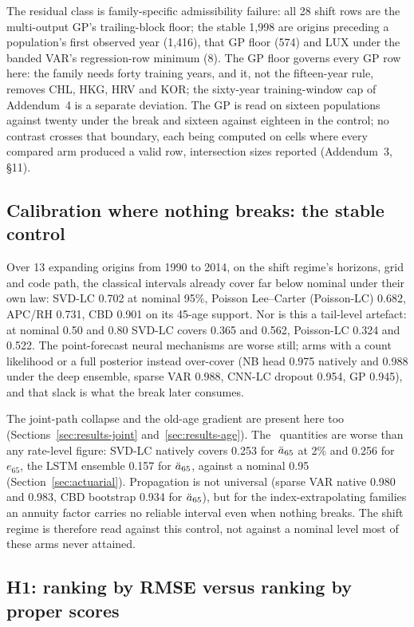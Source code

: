 The residual class is family-specific admissibility failure: all 28 shift rows
are the multi-output GP's trailing-block floor; the stable 1{,}998 are origins
preceding a population's first observed year (1{,}416), that GP floor (574) and
LUX under the banded VAR's regression-row minimum (8). The GP floor governs
every GP row here: the family needs forty training years, and it, not the
fifteen-year rule, removes CHL, HKG, HRV and KOR; the sixty-year
training-window cap of Addendum~4 is a separate deviation. The GP is read on
sixteen populations against twenty under the break and sixteen against eighteen
in the control; no contrast crosses that boundary, each being computed on cells
where every compared arm produced a valid row, intersection sizes reported
(Addendum~3, \S11).

\subsection{Calibration where nothing breaks: the stable control}
\label{sec:results-stable}

Over 13 expanding origins from 1990 to 2014, on the shift regime's horizons,
grid and code path, the classical intervals already cover far below nominal
under their own law: SVD-LC 0.702 at nominal 95\%, Poisson Lee--Carter
(Poisson-LC) 0.682, APC/RH 0.731, CBD 0.901 on its 45-age support. Nor is this a
tail-level artefact: at nominal 0.50 and 0.80 SVD-LC covers 0.365 and 0.562,
Poisson-LC 0.324 and 0.522. The point-forecast neural mechanisms are worse
still; arms with a count likelihood or a full posterior instead over-cover (NB
head 0.975 natively and 0.988 under the deep ensemble, sparse VAR 0.988, CNN-LC
dropout 0.954, GP 0.945), and that slack is what the break later consumes.

The joint-path collapse and the old-age gradient are present here too
(Sections~\ref{sec:results-joint} and~\ref{sec:results-age}). The \Hfive\
quantities are worse than any rate-level figure: SVD-LC natively covers 0.253
for $\ddot{a}_{65}$ at 2\% and 0.256 for $e_{65}$, the LSTM ensemble 0.157 for
$\ddot{a}_{65}$, against a nominal 0.95 (Section~\ref{sec:actuarial}). Propagation is
not universal (sparse VAR native 0.980 and 0.983, CBD bootstrap 0.934 for
$\ddot{a}_{65}$), but for the index-extrapolating families an annuity factor carries
no reliable interval even when nothing breaks. The shift regime is therefore
read against this control, not against a nominal level most of these arms never
attained.

\subsection{H1: ranking by RMSE versus ranking by proper scores}

